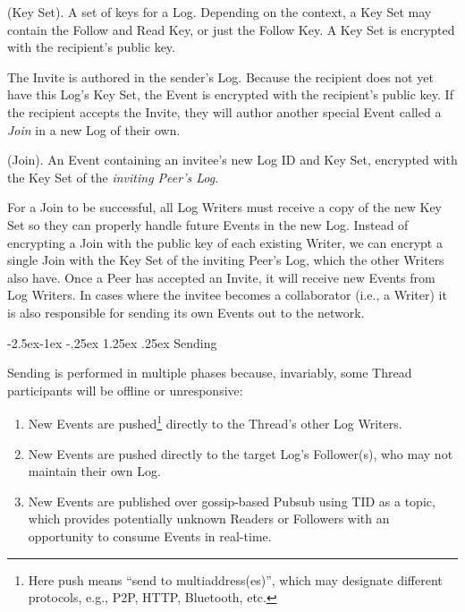 \documentclass{textile}
\makeatletter
\renewcommand\paragraph{\@startsection{paragraph}{4}{\z@}%
            {-2.5ex\@plus -1ex \@minus -.25ex}%
            {1.25ex \@plus .25ex}%
            {\normalfont\normalsize\itshape}}
\makeatother
\begin{document}
\begin{definition}
  (Key Set). A set of keys for a Log. Depending on the context, a Key Set may contain the Follow and Read Key, or just the Follow Key. A Key Set is encrypted with the recipient's public key.
\end{definition}

The Invite is authored in the sender's Log. Because the recipient does not yet have this Log's Key Set, the Event is encrypted with the recipient's public key. If the recipient accepts the Invite, they will author another special Event called a \emph{Join} in a new Log of their own.

\begin{definition}
  (Join). An Event containing an invitee's new Log ID and Key Set, encrypted with the Key Set of the \emph{inviting Peer's Log}.
\end{definition}

For a Join to be successful, all Log Writers must receive a copy of the new Key Set so they can properly handle future Events in the new Log. Instead of encrypting a Join with the public key of each existing Writer, we can encrypt a single Join with the Key Set of the inviting Peer's Log, which the other Writers also have. Once a Peer has accepted an Invite, it will receive new Events from Log Writers. In cases where the invitee becomes a collaborator (i.e., a Writer) it is also responsible for sending its own Events out to the network.

\paragraph{Sending}

Sending is performed in multiple phases because, invariably, some Thread participants will be offline or unresponsive:

\begin{enumerate}
  \item New Events are pushed\footnote{Here push means ``send to multiaddress(es)'', which may designate different protocols, e.g., P2P, HTTP, Bluetooth, etc.} directly to the Thread's other Log Writers.
  \item New Events are pushed directly to the target Log's Follower(s), who may not maintain their own Log.
  \item New Events are published over gossip-based Pubsub using TID as a topic, which provides potentially unknown Readers or Followers with an opportunity to consume Events in real-time.
\end{enumerate}
\end{document}
